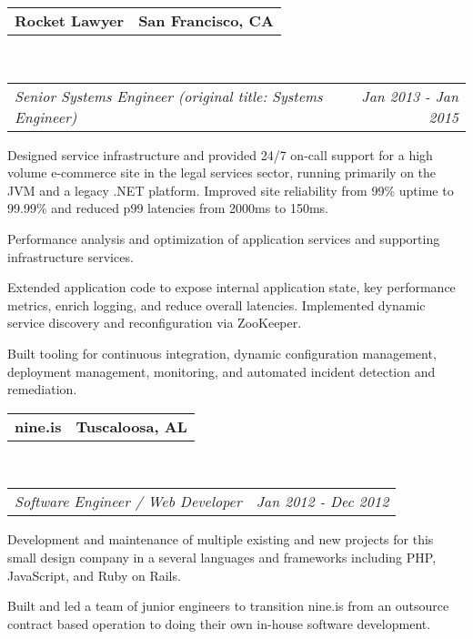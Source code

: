 \documentclass[10pt,letterpaper]{article}
\makeatletter
\newcommand{\headerrow}[2]
{\begin{tabular*}{\linewidth}{l@{\extracolsep{\fill}}r}
	#1 &
	#2 \\
\end{tabular*}}
\newcommand{\employment}[5]{
	\headerrow
		{\textbf{#1}}
		{\textbf{#2}}
	\\
	\headerrow
		{\emph{#3}}
		{\emph{#4}}
	\begin{itemize*}
		\item #5
	\end{itemize*}
}
\makeatother
\begin{document}
\employment{Rocket Lawyer}{San Francisco, CA}{Senior Systems Engineer (original
  title: Systems Engineer)}{Jan 2013 - Jan 2015}{
Designed service infrastructure and provided 24/7 on-call support for a high
volume e-commerce site in the legal services sector, running primarily on the
JVM and a legacy .NET platform. Improved site reliability from 99\% uptime to 99.99\%
and reduced p99 latencies from 2000ms to 150ms.
\item Performance analysis and optimization of application services and supporting infrastructure services.
\item Extended application code to expose internal application
  state, key performance metrics, enrich logging, and reduce overall latencies.
  Implemented dynamic service discovery and reconfiguration via ZooKeeper.
\item Built tooling for continuous integration, dynamic configuration
  management, deployment management, monitoring, and automated incident
  detection and remediation.
}

\employment{nine.is}{Tuscaloosa, AL}{Software Engineer / Web Developer}{Jan 2012 - Dec 2012}{
Development and maintenance of multiple existing and new projects for this small design company in a several languages and frameworks including PHP, JavaScript, and Ruby on Rails.
\item Built and led a team of junior engineers to transition nine.is from an
  outsource contract based operation to doing their own in-house software development.
}
\end{document}
